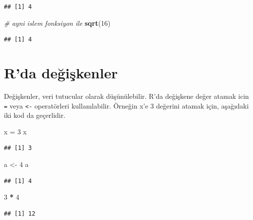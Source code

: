 \documentclass[]{book}
\newenvironment{Shaded}{\begin{snugshade}}{\end{snugshade}}
\newcommand{\CommentTok}[1]{\textcolor[rgb]{0.56,0.35,0.01}{\textit{#1}}}
\newcommand{\DecValTok}[1]{\textcolor[rgb]{0.00,0.00,0.81}{#1}}
\newcommand{\KeywordTok}[1]{\textcolor[rgb]{0.13,0.29,0.53}{\textbf{#1}}}
\newcommand{\NormalTok}[1]{#1}
\newcommand{\OperatorTok}[1]{\textcolor[rgb]{0.81,0.36,0.00}{\textbf{#1}}}
\newcommand{\StringTok}[1]{\textcolor[rgb]{0.31,0.60,0.02}{#1}}
\begin{document}
\begin{verbatim}
## [1] 4
\end{verbatim}

\begin{Shaded}
\begin{Highlighting}[]
\CommentTok{# ayni islem fonksiyon ile}
\KeywordTok{sqrt}\NormalTok{(}\DecValTok{16}\NormalTok{) }
\end{Highlighting}
\end{Shaded}

\begin{verbatim}
## [1] 4
\end{verbatim}

\hypertarget{rda-degiskenler}{%
\section{R'da değişkenler}\label{rda-degiskenler}}

Değişkenler, veri tutucular olarak düşünülebilir. R'da değişkene değer
atamak icin \texttt{=} veya \texttt{\textless{}-} operatörleri
kullanılabilir. Örneğin x'e 3 değerini atamak için, aşağıdaki iki kod da
geçerlidir.

\begin{Shaded}
\begin{Highlighting}[]
\NormalTok{x =}\StringTok{ }\DecValTok{3}
\NormalTok{x}
\end{Highlighting}
\end{Shaded}

\begin{verbatim}
## [1] 3
\end{verbatim}

\begin{Shaded}
\begin{Highlighting}[]
\NormalTok{a <-}\StringTok{ }\DecValTok{4}
\NormalTok{a}
\end{Highlighting}
\end{Shaded}

\begin{verbatim}
## [1] 4
\end{verbatim}

\begin{Shaded}
\begin{Highlighting}[]
\DecValTok{3} \OperatorTok{*}\StringTok{ }\DecValTok{4}
\end{Highlighting}
\end{Shaded}

\begin{verbatim}
## [1] 12
\end{verbatim}
\end{document}
